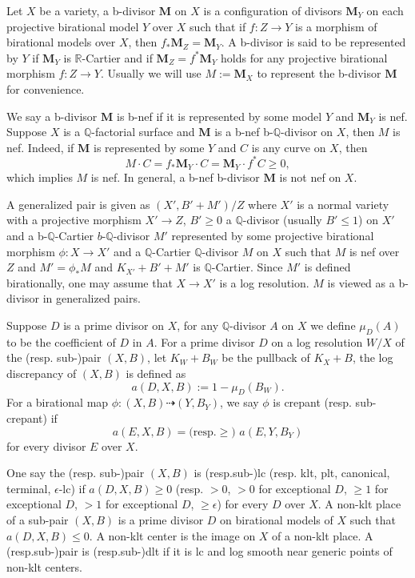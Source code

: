 \documentclass[letterpaper,reqno,12pt]{amsart}
\numberwithin{equation}{section}
\theoremstyle{plain}
\begin{document}
Let $X$ be a variety, a b-divisor $\mathbf M$ on $X$ is a configuration of divisors $\mathbf M_Y$ on each projective birational model $Y$ over $X$ such that if $f:Z\to Y$ is a morphism of birational models over $X$, then $f_*\mathbf M_Z=\mathbf M_Y$. A b-divisor is said to be represented by $Y$ if $\mathbf M_Y$ is $\mathbb R$-Cartier and if $\mathbf M_Z=f^*\mathbf M_Y$ holds for any projective birational morphism $f:Z\to Y$. Usually we will use $M:=\mathbf M_X$ to represent the b-divisor $\mathbf M$ for convenience.

We say a b-divisor $\mathbf M$ is b-nef if it is represented by some model $Y$ and $\mathbf M_Y$ is nef. Suppose $X$ is a $\mathbb Q$-factorial surface and $\mathbf M$ is a b-nef b-$\mathbb Q$-divisor on $X$, then $M$ is nef. Indeed, if $\mathbf M$ is represented by some $Y$ and $C$ is any curve on $X$, then \[M\cdot C=f_*\mathbf M_Y\cdot C=\mathbf M_Y\cdot f^*C\geq0,\] which implies $M$ is nef. In general, a b-nef b-divisor $\mathbf M$ is not nef on $X$.

A generalized pair is given as $(X',B'+M')/Z$ where $X'$ is a normal variety with a projective morphism $X'\to Z$, $B'\geq0$ a $\mathbb Q$-divisor (usually $B'\leq 1$) on $X'$ and a b-$\mathbb Q$-Cartier $b$-$\mathbb Q$-divisor $M'$ represented by some projective birational morphism $\phi:X\to X'$ and a $\mathbb Q$-Cartier $\mathbb Q$-divisor $M$ on $X$ such that $M$ is nef over $Z$ and $M'=\phi_*M$ and $K_{X'}+B'+M'$ is $\mathbb Q$-Cartier. Since $M'$ is defined birationally, one may assume that $X\to X'$ is a log resolution. $M$ is viewed as a b-divisor in generalized pairs.

Suppose $D$ is a prime divisor on $X$, for any $\mathbb Q$-divisor $A$ on $X$ we define $\mu_D(A)$ to be the coefficient of $D$ in $A$. For a prime divisor $D$ on a log resolution $W/X$ of the (resp. sub-)pair $(X,B)$, let $K_W+B_W$ be the pullback of $K_X+B$, the log discrepancy of $(X,B)$ is defined as \[a(D,X,B):=1-\mu_D(B_W).\] For a birational map $\phi:(X,B)\dashrightarrow(Y,B_Y)$, we say $\phi$ is crepant (resp. sub-crepant) if 
\[a(E,X,B)=\text{(resp.}\geq\text{) }a(E,Y,B_Y)\]for every divisor $E$ over $X$.

One say the (resp. sub-)pair $(X,B)$ is (resp.sub-)lc (resp. klt, plt, canonical, terminal, $\epsilon$-lc) if $a(D,X,B)\geq 0$ (resp. $>0$, $>0$ for exceptional $D$, $\geq 1$ for exceptional $D$, $>1$ for exceptional $D$, $\geq\epsilon$) for every $D$ over $X$. A non-klt place of a sub-pair $(X,B)$ is a prime divisor $D$ on birational models of $X$ such that $a(D,X,B)\leq0$. A non-klt center is the image on $X$ of a non-klt place. A (resp.sub-)pair is (resp.sub-)dlt if it is lc and log smooth near generic points of non-klt centers.
\end{document}
